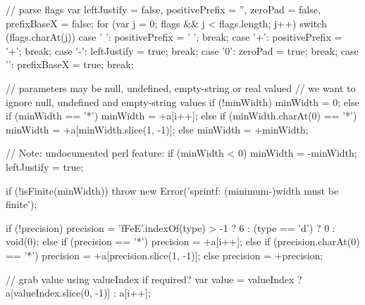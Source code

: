 {{        // parse flags
        var leftJustify = false, positivePrefix = '', zeroPad = false, prefixBaseX = false;
        for (var j = 0; flags && j < flags.length; j++) switch (flags.charAt(j)) {
            case ' ': positivePrefix = ' '; break;
            case '+': positivePrefix = '+'; break;
            case '-': leftJustify = true; break;
            case '0': zeroPad = true; break;
            case '\pgfplotsHASH': prefixBaseX = true; break;
        }

        // parameters may be null, undefined, empty-string or real valued
        // we want to ignore null, undefined and empty-string values
        if (!minWidth) {
            minWidth = 0;
        } else if (minWidth == '*') {
            minWidth = +a[i++];
        } else if (minWidth.charAt(0) == '*') {
            minWidth = +a[minWidth.slice(1, -1)];
        } else {
            minWidth = +minWidth;
        }

        // Note: undocumented perl feature:
        if (minWidth < 0) {
            minWidth = -minWidth;
            leftJustify = true;
        }

        if (!isFinite(minWidth)) {
            throw new Error('sprintf: (minimum-)width must be finite');
        }

        if (!precision) {
            precision = 'fFeE'.indexOf(type) > -1 ? 6 : (type == 'd') ? 0 : void(0);
        } else if (precision == '*') {
            precision = +a[i++];
        } else if (precision.charAt(0) == '*') {
            precision = +a[precision.slice(1, -1)];
        } else {
            precision = +precision;
        }

        // grab value using valueIndex if required?
        var value = valueIndex ? a[valueIndex.slice(0, -1)] : a[i++];

}}
